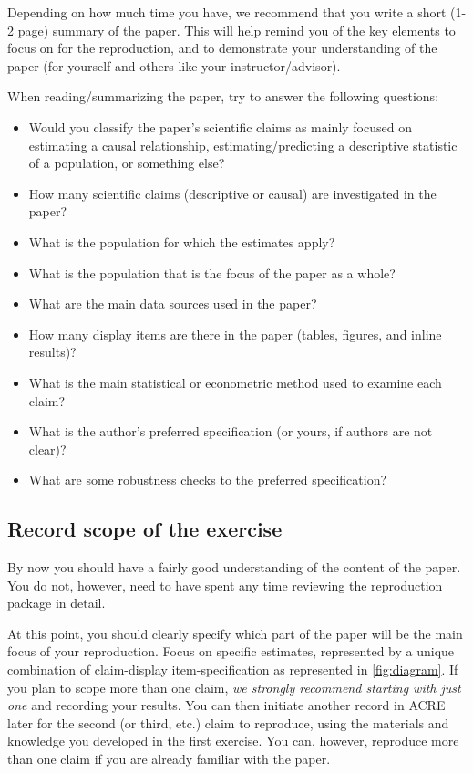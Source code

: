 \documentclass[]{book}
\providecommand{\tightlist}{%
  \setlength{\itemsep}{0pt}\setlength{\parskip}{0pt}}
\begin{document}
Depending on how much time you have, we recommend that you write a short (1-2 page) summary of the paper. This will help remind you of the key elements to focus on for the reproduction, and to demonstrate your understanding of the paper (for yourself and others like your instructor/advisor).

When reading/summarizing the paper, try to answer the following questions:

\begin{itemize}
\tightlist
\item
  Would you classify the paper's scientific claims as mainly focused on estimating a causal relationship, estimating/predicting a descriptive statistic of a population, or something else?
\item
  How many scientific claims (descriptive or causal) are investigated in the paper?
\item
  What is the population for which the estimates apply?
\item
  What is the population that is the focus of the paper as a whole?
\item
  What are the main data sources used in the paper?
\item
  How many display items are there in the paper (tables, figures, and inline results)?\\
\item
  What is the main statistical or econometric method used to examine each claim?
\item
  What is the author's preferred specification (or yours, if authors are not clear)?
\item
  What are some robustness checks to the preferred specification?
\end{itemize}

\hypertarget{declare-estimates}{%
\subsection{Record scope of the exercise}\label{declare-estimates}}

By now you should have a fairly good understanding of the content of the paper. You do not, however, need to have spent any time reviewing the reproduction package in detail.

At this point, you should clearly specify which part of the paper will be the main focus of your reproduction. Focus on specific estimates, represented by a unique combination of claim-display item-specification as represented in \ref{fig:diagram}. If you plan to scope more than one claim, \emph{we strongly recommend starting with just one} and recording your results. You can then initiate another record in ACRE later for the second (or third, etc.) claim to reproduce, using the materials and knowledge you developed in the first exercise. You can, however, reproduce more than one claim if you are already familiar with the paper.
\end{document}
